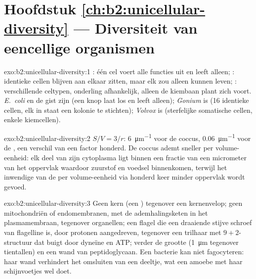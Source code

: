 \section*{Hoofdstuk \ref{ch:b2:unicellular-diversity} --- Diversiteit van eencellige organismen}

\begin{solution}{exo:b2:unicellular-diversity:1}
: één cel voert alle functies uit en leeft alleen; :
identieke cellen blijven aan elkaar zitten, maar elk zou alleen kunnen
leven; : verschillende celtypen, onderling afhankelijk, alleen
de kiembaan plant zich voort. \emph{E.~coli} en de gist zijn 
(een knop laat los en leeft alleen); \emph{Gonium} is  (16
identieke cellen, elk in staat een kolonie te stichten); \emph{Volvox}
is  (sterfelijke somatische cellen, enkele kiemcellen).
\end{solution}

\begin{solution}{exo:b2:unicellular-diversity:2}
$S/V = 3/r$: \qty{6}{\micro m^{-1}} voor de coccus,
\qty{0.06}{\micro m^{-1}} voor de , een verschil van een factor honderd.
De coccus ademt sneller per volume-eenheid: elk deel van zijn
cytoplasma ligt binnen een fractie van een micrometer van het oppervlak
waardoor zuurstof en voedsel binnenkomen, terwijl het inwendige van de
 per volume-eenheid via honderd keer minder oppervlak wordt gevoed.
\end{solution}

\begin{solution}{exo:b2:unicellular-diversity:3}
Geen kern (een ) tegenover een kernenvelop; geen mitochondriën of
endomembranen, met de ademhalingsketen in het plasmamembraan, tegenover
organellen; een flagel die een draaiende stijve schroef van flagelline is,
door protonen aangedreven, tegenover een trilhaar met $9+2$-structuur dat
buigt door dyneïne en ATP; verder de grootte (\qty{1}{\micro m} tegenover
tientallen) en een wand van peptidoglycaan. Een bacterie kan niet
fagocyteren: haar wand verhindert het omsluiten van een deeltje, wat een
amoebe met haar schijnvoetjes wel doet.
\end{solution}

